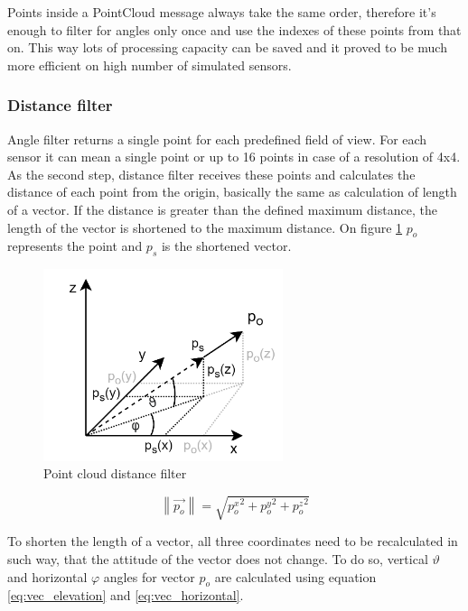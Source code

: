 Points inside a PointCloud message always take the same order, therefore it's enough to filter 
for angles only once and use the indexes of these points from that on. This way lots of processing capacity
can be saved and it proved to be much more efficient on high number of simulated sensors.


\subsubsection{Distance filter}
Angle filter returns a single point for each predefined field of view. For each sensor it can mean a single 
point or up to 16 points in case of a resolution of 4x4. As the second step, distance filter receives these 
points and calculates the distance of each point from the origin, basically the same as calculation of length
of a vector. If the distance is greater than the defined maximum distance, the length of the vector
is shortened to the maximum distance. On figure \ref{fig:data_distance_filter} $p_{o}$ represents the 
point and $p_{s}$ is the shortened vector.

\begin{figure}[!ht]
    \centering
    \includegraphics[width=70mm, keepaspectratio]{figures/data_distance_filter.png}
    \caption{Point cloud distance filter}
    \label{fig:data_distance_filter}
\end{figure}

\begin{equation} \label{eq:point_length}
    \left\|\vec{p_{o}}\right\| = \sqrt{{p_{o}^{x}}^{2}+{p_{o}^{y}}^{2}+{p_{o}^{z}}^{2}}
\end{equation}

To shorten the length of a vector, all three coordinates need to be recalculated in such way, that the attitude of
the vector does not change. To do so, vertical $\vartheta$ and horizontal $\varphi$ angles for vector $p_{o}$
are calculated using equation \ref{eq:vec_elevation} and \ref{eq:vec_horizontal}.

